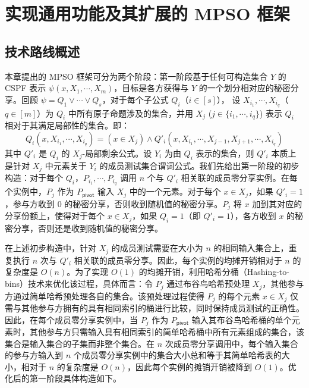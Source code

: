 \section{实现通用功能及其扩展的 MPSO 框架}

\subsection{技术路线概述}

本章提出的 MPSO 框架可分为两个阶段：第一阶段基于任何可构造集合 $Y$ 的 CSPF 表示 $\psi(x, X_1, \cdots, X_m)$，目标是各方获得与 $Y$ 的一个划分相对应的秘密分享。回顾 $\psi = Q_1 \lor \cdots \lor Q_s$，对于每个子公式 $Q_i$（$i \in [s]$），
设 $X_{i_1},\cdots,X_{i_q}$（$q \in [m]$）为 $Q_i$ 中所有原子命题涉及的集合，并用 $X_j$ ($j \in \{{i_1},\cdots,{i_q}\}$) 表示 $Q_i$ 相对于其满足局部性的集合。即：$$Q_i(x,X_{i_1},\cdots,X_{i_q}) = (x \in X_j) \land Q'_i(x,X_{i_1},\cdots,X_{j-1},X_{j+1},\cdots,X_{i_q})$$ 其中 $Q'_i$ 是 $Q_i$ 的 $X_j$-局部剩余公式。设 $Y_i$ 为由 $Q_i$ 表示的集合，则 $Q'_i$ 本质上是针对 $X_j$ 中元素关于 $Y_i$ 的成员测试集合谓词公式。我们先给出第一阶段的初步构造：对于每个 $Q_i$，$P_{i_1},\cdots,P_{i_q}$ 调用 $n$ 个与 $Q'_i$ 相关联的成员零分享实例。在每个实例中，$P_j$ 作为 $P_{\mathsf{pivot}}$ 输入 $X_j$ 中的一个元素。对于每个 $x \in X_j$，如果 $Q'_i = 1$，参与方收到 0 的秘密分享，否则收到随机值的秘密分享。$P_j$ 将 $x$ 加到其对应的分享份额上，使得对于每个 $x \in X_j$，如果 $Q_i = 1$（即 $Q'_i = 1$），各方收到 $x$ 的秘密分享，否则还是收到随机值的秘密分享。

在上述初步构造中，针对 $X_j$ 的成员测试需要在大小为 $n$ 的相同输入集合上，重复执行 $n$ 次与 $Q'_i$ 相关联的成员零分享。因此，每个实例的均摊开销相对于 $n$ 的复杂度是 $O(n)$。为了实现 $O(1)$ 的均摊开销，利用哈希分桶（Hashing-to-bins）技术来优化该过程，具体而言：令 $P_j$ 通过布谷鸟哈希预处理 $X_j$，其他参与方通过简单哈希预处理各自的集合。该预处理过程使得 $P_j$ 的每个元素 $x \in X_j$ 仅需与其他参与方拥有的具有相同索引的桶进行比较，同时保持成员测试的正确性。因此，在每个成员零分享实例中，当 $P_j$ 作为 $P_{\mathsf{pivot}}$ 输入其布谷鸟哈希桶的单个元素时，其他参与方只需输入具有相同索引的简单哈希桶中所有元素组成的集合，该集合是输入集合的子集而非整个集合。在 $n$ 次成员零分享调用中，每个输入集合的参与方输入到 $n$ 个成员零分享实例中的集合大小总和等于其简单哈希表的大小，相对于 $n$ 的复杂度是 $O(n)$，因此每个实例的摊销开销被降到 $O(1)$。优化后的第一阶段具体构造如下。

